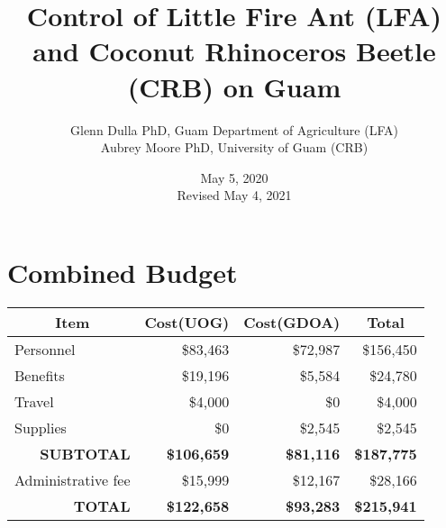 \documentclass[12pt,letterpaper,english,bibliography=totocnumbered, abstract=on]{scrartcl}
\begin{document}
\titlehead{Grant Proposal: USDA Forest Service FY2020}

\title{Control of Little Fire Ant (LFA) and Coconut Rhinoceros Beetle (CRB) on Guam}

\author{Glenn Dulla PhD, Guam Department of Agriculture (LFA)\\
	Aubrey Moore PhD, University of Guam (CRB)}

\date{May 5, 2020\\Revised May 4, 2021}

\maketitle
\newpage
\tableofcontents

\pagebreak

\section{Combined Budget}

\begin{table}[h]
	\centering
	\begin{tabular}{@{}lrrr@{}}
		\toprule
		\multicolumn{1}{c}{\textbf{Item}} & \multicolumn{1}{c}{\textbf{Cost(UOG)}} & \multicolumn{1}{c}{\textbf{Cost(GDOA)}} & \multicolumn{1}{c}{\textbf{Total}} \\ 
		\midrule
		Personnel & \$83,463 & \$72,987 & \$156,450 \\
		Benefits  & \$19,196 & \$5,584 & \$24,780 \\
		Travel & \$4,000 & \$0 & \$4,000 \\
		Supplies & \$0 & \$2,545 & \$2,545 \\ 
		\midrule
		\multicolumn{1}{r}{\textbf{SUBTOTAL}} & \textbf{\$106,659} & \textbf{\$81,116} & \textbf{\$187,775} \\ \midrule
		Administrative fee & \$15,999 & \$12,167 & \$28,166 \\ \midrule
		\multicolumn{1}{r}{\textbf{TOTAL}} & \textbf{\$122,658} & \textbf{\$93,283} & \textbf{\$215,941} \\ \bottomrule
	\end{tabular}
\end{table}
\end{document}
